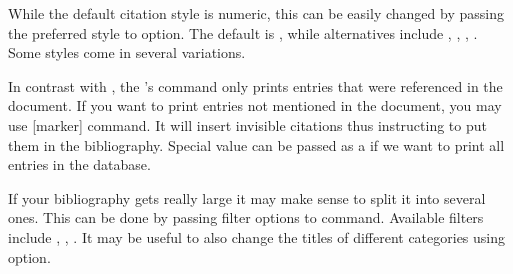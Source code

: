 While the default citation style is numeric, this can be easily changed by
passing the preferred style to  option. The default is
, while alternatives include ,
, , . Some styles come in
several variations.

In contrast with , the 's
 command only prints entries that were referenced in the
document. If you want to print entries not mentioned in the document, you may
use [marker] command. It will insert invisible citations thus
instructing  to put them in the bibliography. Special value
\cargv{*} can be passed as a  if we want to print all entries in
the database.

If your bibliography gets really large it may make sense to split it into
several ones. This can be done by passing filter options to
 command. Available filters include ,
, . It may be useful to also change the titles of
different categories using  option.

